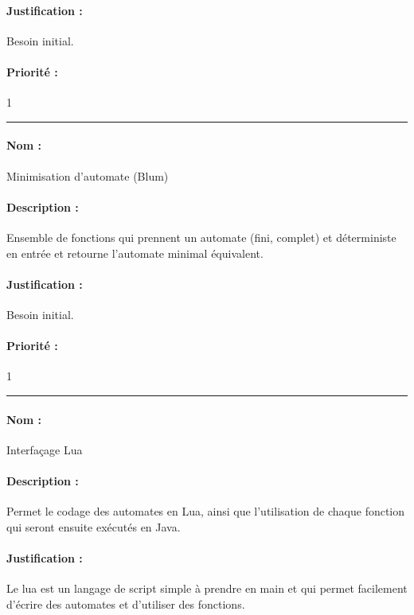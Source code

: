\documentclass{article}%
\begin{document}
\paragraph{Justification :} Besoin initial.

\paragraph{Priorité :} 1\\

\rule{\linewidth}{1pt}

\paragraph{Nom :} Minimisation d'automate (Blum)

\paragraph{Description :} Ensemble de fonctions qui prennent un automate (fini, complet) et déterministe en entrée et retourne l'automate minimal équivalent.

\paragraph{Justification :} Besoin initial.

\paragraph{Priorité :} 1\\

\rule{\linewidth}{1pt}

\paragraph{Nom :} Interfaçage Lua

\paragraph{Description :} Permet le codage des automates en Lua, ainsi que l'utilisation de chaque fonction qui seront ensuite exécutés en Java.

\paragraph{Justification :} Le lua est un langage de script simple à prendre en main et qui permet facilement d'écrire des automates et d'utiliser des fonctions.
\end{document}
